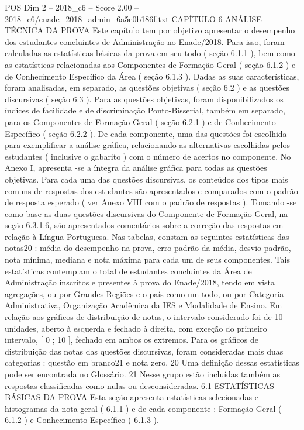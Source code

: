 \begin{textsample}{POS Dim 2 – 2018\_c6 – Score 2.00 – 2018\_c6/enade\_2018\_admin\_6a5e0b186f.txt}  \label{ex:f2_pos_196}
CAPÍTULO 6 ANÁLISE TÉCNICA DA PROVA Este capítulo tem por objetivo apresentar o desempenho dos estudantes concluintes de Administração no Enade/2018.
Para isso, foram calculadas as estatísticas básicas da prova em seu todo ( seção 6.1.1 ), bem como as estatísticas relacionadas aos Componentes de Formação Geral ( seção 6.1.2 ) e de Conhecimento Específico da Área ( seção 6.1.3 ).
Dadas as suas características, foram analisadas, em separado, as questões objetivas ( seção 6.2 ) e as questões discursivas ( seção 6.3 ).
Para as questões objetivas, foram disponibilizados os índices de facilidade e de discriminação Ponto-Bisserial, também em separado, para os Componentes de Formação Geral ( seção 6.2.1 ) e de Conhecimento Específico ( seção 6.2.2 ).
De cada componente, uma das questões foi escolhida para exemplificar a análise gráfica, relacionando as alternativas escolhidas pelos estudantes ( inclusive o gabarito ) com o número de acertos no componente.
No Anexo I, apresenta -se a íntegra da análise gráfica para todas as questões objetivas.
Para cada uma das questões discursivas, os conteúdos dos tipos mais comuns de respostas dos estudantes são apresentados e comparados com o padrão de resposta esperado ( ver Anexo VIII com o padrão de respostas ).
Tomando -se como base as duas questões discursivas do Componente de Formação Geral, na seção 6.3.1.6, são apresentados comentários sobre a correção das respostas em relação à Língua Portuguesa.
Nas tabelas, constam as seguintes estatísticas das notas20 : média do desempenho na prova, erro padrão da média, desvio padrão, nota mínima, mediana e nota máxima para cada um de seus componentes.
Tais estatísticas contemplam o total de estudantes concluintes da Área de Administração inscritos e presentes à prova do Enade/2018, tendo em vista agregações, ou por Grandes Regiões e o país como um todo, ou por Categoria Administrativa, Organização Acadêmica da IES e Modalidade de Ensino.
Em relação aos gráficos de distribuição de notas, o intervalo considerado foi de 10 unidades, aberto à esquerda e fechado à direita, com exceção do primeiro intervalo, [ 0 ; 10 ], fechado em ambos os extremos.
Para os gráficos de distribuição das notas das questões discursivas, foram consideradas mais duas categorias : questão em branco21 e nota zero. 20 Uma definição dessas estatísticas pode ser encontrada no Glossário. 21 Nesse grupo estão incluídas também as respostas classificadas como nulas ou desconsideradas. 6.1 ESTATÍSTICAS BÁSICAS DA PROVA Esta seção apresenta estatísticas selecionadas e histogramas da nota geral ( 6.1.1 ) e de cada componente : Formação Geral ( 6.1.2 ) e Conhecimento Específico ( 6.1.3 ).

\end{textsample}
